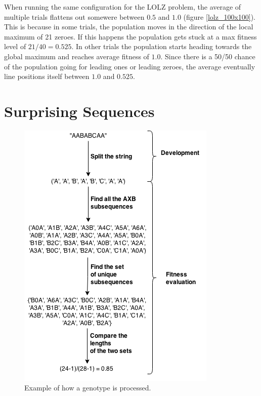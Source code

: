 When running the same configuration for the LOLZ problem,
the average of multiple trials flattens out somewere between $0.5$ and $1.0$ (figure \ref{lolz_100x100}).
This is because in some trials,
the population moves in the direction of the local maximum of 21 zeroes.
If this happens the population gets stuck at a max fitness level of $21/40 = 0.525$.
In other trials the population starts heading towards the global maximum and reaches average fitness of $1.0$.
Since there is a 50/50 chance of the population going for leading ones or leading zeroes,
the average eventually line positions itself between $1.0$ and $0.525$.

\section*{Surprising Sequences}
\begin{figure}[width=\textwidth]
    \begin{centering}
        \includegraphics[width=\linewidth]{img/surprising_process.png}
        \caption{Example of how a genotype is processed.}
        \label{}
    \end{centering}
\end{figure}

